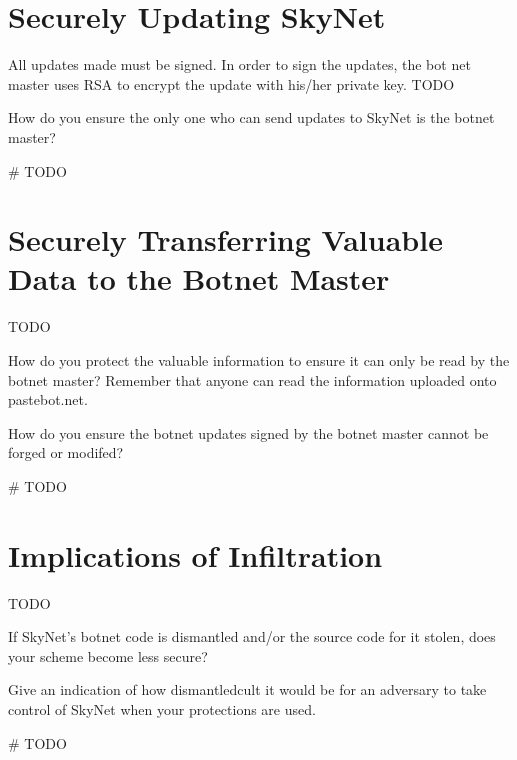 \documentclass[9pt,a4paper]{article}
\begin{document}
\maketitle
\small
\setlength{\parindent}{0pt}

\section{Securely Updating SkyNet}
\vspace{-2ex}
All updates made must be signed. In order to sign the updates, the bot net master uses RSA to encrypt the update with his/her private key. 
TODO

How do you ensure the only one who can send updates to SkyNet is the botnet master?


\begin{center}
\vspace{-2ex}
\begin{python}
# TODO
\end{python}
\end{center}

\section{Securely Transferring Valuable Data to the Botnet Master}
\vspace{-2ex}
TODO

How do you protect the valuable information to ensure it can only  be read by the botnet master? Remember that anyone can read the  information uploaded onto pastebot.net.

 How do you ensure the botnet updates signed by the botnet master cannot be forged or modifed?

\begin{center}
\vspace{-2ex}
\begin{python}
# TODO
\end{python}
\end{center}

\section{Implications of Infiltration}
\vspace{-2ex}
TODO

If SkyNet's botnet code is dismantled and/or the source code for it stolen, does your scheme become less secure?


Give an indication of how dismantledcult it would be for an adversary to take control of SkyNet when your protections are used.

\begin{center}
\vspace{-2ex}
\begin{python}
# TODO
\end{python}\end{center}
\end{document}
